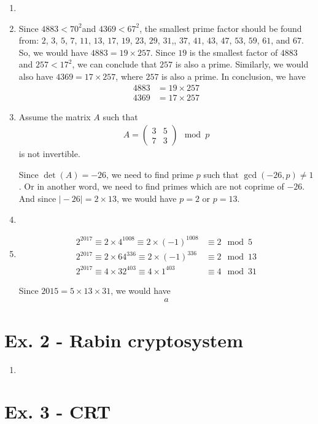 \documentclass[11pt,a4paper]{article}
\begin{document}
\begin{enumerate}
	\item 
	
	\item Since $4883 < 70^{2}$and $4369 < 67^{2}$, the smallest prime factor should be found from: $2$, $3$, $5$, $7$, $11$, $13$, $17$, $19$, $23$, $29$, $31$,, $37$, $41$, $43$, $47$, $53$, $59$, $61$, and $67$. So, we would have $4883 = 19 \times 257$. Since $19$ is the smallest factor of $4883$ and $257 < 17^{2}$, we can conclude that $257$ is also a prime. Similarly, we would also have $4369 = 17 \times 257$, where $257$ is also a prime. In conclusion, we have
		\begin{align*}
			4883 &= 19 \times 257 \\
			4369 &= 17 \times 257
		\end{align*}
		
	\item Assume the matrix $A$ such that
		\begin{align*}
			A = \begin{pmatrix} 3 & 5 \\ 7 & 3 \end{pmatrix} \mod p
		\end{align*}
		is not invertible.
		\par Since $\det(A) = -26$, we need to find prime $p$ such that $\gcd(-26, p) \neq 1$. Or in another word, we need to find primes which are not coprime of $-26$. And since $\vert -26 \vert = 2 \times 13$, we would have $p = 2$ or $p = 13$.
	
	\item 
	
	\item 
		\begin{align*}
			2^{2017} \equiv 2 \times 4^{1008} \equiv 2 \times (-1)^{1008} &\equiv 2 \mod 5 \\
			2^{2017} \equiv 2 \times 64^{336} \equiv 2 \times (-1)^{336} &\equiv 2 \mod 13 \\
			2^{2017} \equiv 4 \times 32^{403} \equiv 4 \times 1^{403} &\equiv 4 \mod 31
		\end{align*}
	\par Since $2015 = 5 \times 13 \times 31$, we would have
		\begin{align*}
			a
		\end{align*}
	
\end{enumerate}


\section*{Ex. 2 - Rabin cryptosystem}
\begin{enumerate}
	\item 
\end{enumerate}

\section*{Ex. 3 - CRT}
\end{document}
